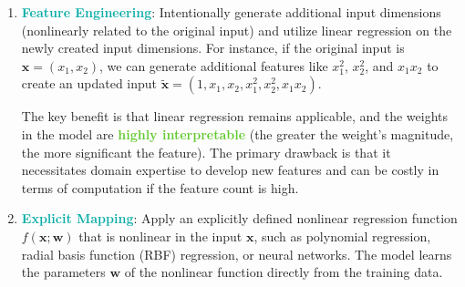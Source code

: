 \documentclass[twoside]{article}
\newcommand{\highlightbluetext}[1]{\textcolor[HTML]{09ACA6}{\textbf{#1}}}
\newcommand{\highlightgreentext}[1]{\textcolor[HTML]{62C92F}{\textbf{#1}}}
\numberwithin{equation}{section}
\begin{document}
	\begin{enumerate}
		\item \highlightbluetext{Feature Engineering}: Intentionally generate additional input dimensions (nonlinearly related to the original input) and utilize linear regression on the newly created input dimensions. For instance, if the original input is $\mathbf{x} = (x_1, x_2)$, we can generate additional features like $x_1^2$, $x_2^2$, and $x_1 x_2$ to create an updated input $\mathbf{\tilde{x}} = (1, x_1, x_2, x_1^2, x_2^2, x_1 x_2)$. 

		The key benefit is that linear regression remains applicable, and the weights in the model are \highlightgreentext{highly interpretable} (the greater the weight's magnitude, the more significant the feature). The primary drawback is that it necessitates domain expertise to develop new features and can be costly in terms of computation if the feature count is high.
		\begin{center}
		\end{center}

		\newpage
		\item \highlightbluetext{Explicit Mapping}: Apply an explicitly defined nonlinear regression function $f(\mathbf{x}; \mathbf{w})$ that is nonlinear in the input $\mathbf{x}$, such as polynomial regression, radial basis function (RBF) regression, or neural networks. The model learns the parameters $\mathbf{w}$ of the nonlinear function directly from the training data.
		
	\end{enumerate}
\end{document}
